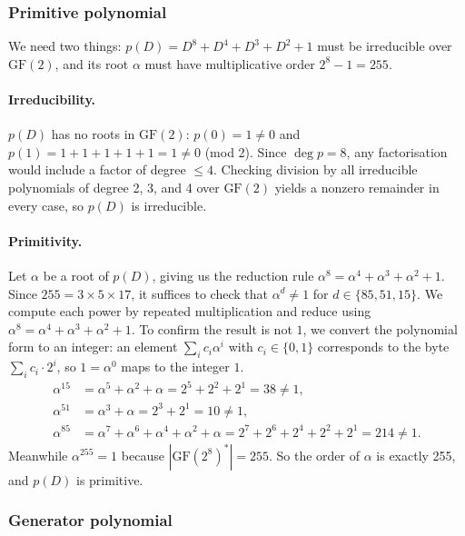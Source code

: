 \documentclass[11pt,a4paper]{article}
\begin{document}
\subsubsection{Primitive polynomial}

We need two things: $p(D) = D^8 + D^4 + D^3 + D^2 + 1$ must be irreducible over $\text{GF}(2)$, and its root $\alpha$ must have multiplicative order $2^8 - 1 = 255$.

\paragraph{Irreducibility.}
$p(D)$ has no roots in $\text{GF}(2)$: $p(0) = 1 \neq 0$ and $p(1) = 1+1+1+1+1 = 1 \neq 0$ (mod 2).
Since $\deg p = 8$, any factorisation would include a factor of degree $\leq 4$. Checking division by all irreducible polynomials of degree 2, 3, and 4 over $\text{GF}(2)$ yields a nonzero remainder in every case, so $p(D)$ is irreducible.

\paragraph{Primitivity.}
Let $\alpha$ be a root of $p(D)$, giving us the reduction rule $\alpha^8 = \alpha^4 + \alpha^3 + \alpha^2 + 1$.
Since $255 = 3 \times 5 \times 17$, it suffices to check that $\alpha^d \neq 1$ for $d \in \{85, 51, 15\}$. We compute each power by repeated multiplication and reduce using $\alpha^8 = \alpha^4 + \alpha^3 + \alpha^2 + 1$. To confirm the result is not $1$, we convert the polynomial form to an integer: an element $\sum_i c_i \alpha^i$ with $c_i \in \{0,1\}$ corresponds to the byte $\sum_i c_i \cdot 2^i$, so $1 = \alpha^0$ maps to the integer $1$.
\begin{align*}
\alpha^{15} &= \alpha^5 + \alpha^2 + \alpha
= 2^5 + 2^2 + 2^1 = 38 \neq 1,\\
\alpha^{51} &= \alpha^3 + \alpha
= 2^3 + 2^1 = 10 \neq 1,\\
\alpha^{85} &= \alpha^7 + \alpha^6 + \alpha^4 + \alpha^2 + \alpha
= 2^7 + 2^6 + 2^4 + 2^2 + 2^1 = 214 \neq 1.
\end{align*}
Meanwhile $\alpha^{255} = 1$ because $|\text{GF}(2^8)^*| = 255$. So the order of $\alpha$ is exactly 255, and $p(D)$ is primitive.

\subsubsection{Generator polynomial}
\end{document}
